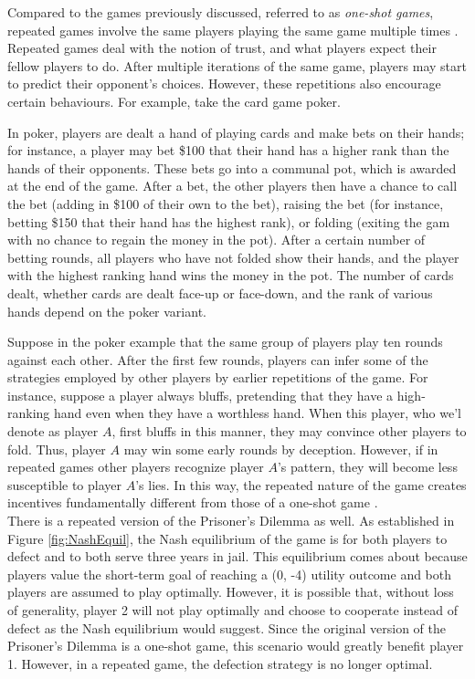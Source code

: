 Compared to the games previously discussed, referred to as \textit{one-shot games}, repeated games involve the same players playing the same game multiple times \cite{mail06}. Repeated games deal with the notion of trust, and what players expect their fellow players to do. After multiple iterations of the same game, players may start to predict their opponent's choices. However, these repetitions also encourage certain behaviours. For example, take the card game poker.
\begin{exmp}
  In poker, players are dealt a hand of playing cards and make bets on their hands; for instance, a player may bet \$100 that their hand has a higher rank than the hands of their opponents. These bets go into a communal pot, which is awarded at the end of the game. After a bet, the other players then have a chance to call the bet (adding in \$100 of their own to the bet), raising the bet (for instance, betting \$150 that their hand has the highest rank), or folding (exiting the gam with no chance to regain the money in the pot). After a certain number of betting rounds, all players who have not folded show their hands, and the player with the highest ranking hand wins the money in the pot. The number of cards dealt, whether cards are dealt face-up or face-down, and the rank of various hands depend on the poker variant.
\end{exmp}

Suppose in the poker example that the same group of players play ten rounds against each other. After the first few rounds, players can infer some of the strategies employed by other players by earlier repetitions of the game. For instance, suppose a player always bluffs, pretending that they have a high-ranking hand even when they have a worthless hand. When this player, who we'l denote as player $A$, first bluffs in this manner, they may convince other players to fold. Thus, player $A$ may win some early rounds by deception. However, if in repeated games other players recognize player $A$'s pattern, they will become less susceptible to player $A$'s lies. In this way, the repeated nature of the game creates incentives fundamentally different from those of a one-shot game \cite{mail06}.\\

There is a repeated version of the Prisoner's Dilemma as well. As established in Figure \ref{fig:NashEquil}, the Nash equilibrium of the game is for both players to defect and to both serve three years in jail. This equilibrium comes about because players value the short-term goal of reaching a (0, -4) utility outcome \cite{osbo94} and both players are assumed to play optimally. However, it is possible that, without loss of generality, player 2 will not play optimally and choose to cooperate instead of defect as the Nash equilibrium would suggest. Since the original version of the Prisoner's Dilemma is a one-shot game, this scenario would greatly benefit player 1. However, in a repeated game, the defection strategy is no longer optimal.

